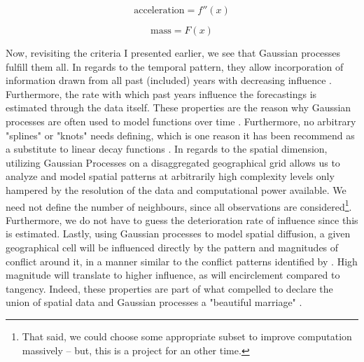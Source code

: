 \documentclass[a4paper]{article}
\begin{document}
\[
\text{acceleration} = f''(x) \tag{12}  \label{eq:acc}
\]

\[
\text{mass} = F(x) \tag{13}  \label{eq:mass}
\]


Now, revisiting the criteria I presented earlier, we see that Gaussian processes fulfill them all. In regards to the temporal pattern, they allow incorporation of information drawn from all past (included) years with decreasing influence \citep[410-419]{Mcelreath_2018}. Furthermore, the rate with which past years influence the forecastings is estimated through the data itself. These properties are the reason why Gaussian processes are often used to model functions over time \citep[13]{williams2006gaussian}. Furthermore, no arbitrary "splines" or "knots" needs defining, which is one reason it has been recommend as a substitute to linear decay functions \cite[501]{Gelman_2013}. In regards to the spatial dimension, utilizing Gaussian Processes on a disaggregated geographical grid allows us to analyze and model spatial patterns at arbitrarily high complexity levels only hampered by the resolution of the data and computational power available. We need not define the number of neighbours, since all observations are considered\footnote{That said, we could choose some appropriate subset to improve computation massively \citep{gelfand2016spatial} -- but, this is a project for an other time.}. Furthermore, we do not have to guess the deterioration rate of influence since this is estimated. Lastly, using Gaussian processes to model spatial diffusion, a given geographical cell will be influenced directly by the pattern and magnitudes of conflict around it, in a manner similar to the conflict patterns identified by \cite{schutte2011diffusion}. High magnitude will translate to higher influence, as will encirclement compared to tangency. Indeed, these properties are part of what compelled \cite{gelfand2016spatial} to declare the union of spatial data and Gaussian processes a "beautiful marriage" \citep[86]{gelfand2016spatial}.
\end{document}
